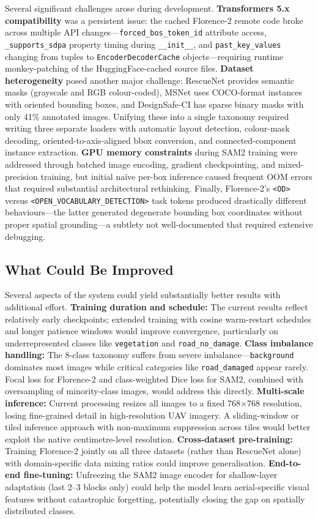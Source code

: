 \documentclass[10pt,a4paper,twocolumn]{article}
\begin{document}
Several significant challenges arose during development. \textbf{Transformers 5.x compatibility} was a persistent issue: the cached Florence-2 remote code broke across multiple API changes---\texttt{forced\_bos\_token\_id} attribute access, \texttt{\_supports\_sdpa} property timing during \texttt{\_\_init\_\_}, and \texttt{past\_key\_values} changing from tuples to \texttt{EncoderDecoderCache} objects---requiring runtime monkey-patching of the HuggingFace-cached source files. \textbf{Dataset heterogeneity} posed another major challenge: RescueNet provides semantic masks (grayscale and RGB colour-coded), MSNet uses COCO-format instances with oriented bounding boxes, and DesignSafe-CI has sparse binary masks with only 41\% annotated images. Unifying these into a single taxonomy required writing three separate loaders with automatic layout detection, colour-mask decoding, oriented-to-axis-aligned bbox conversion, and connected-component instance extraction. \textbf{GPU memory constraints} during SAM2 training were addressed through batched image encoding, gradient checkpointing, and mixed-precision training, but initial na\"ive per-box inference caused frequent OOM errors that required substantial architectural rethinking. Finally, Florence-2's \texttt{<OD>} versus \texttt{<OPEN\_VOCABULARY\_DETECTION>} task tokens produced drastically different behaviours---the latter generated degenerate bounding box coordinates without proper spatial grounding---a subtlety not well-documented that required extensive debugging.

\subsection{What Could Be Improved}

Several aspects of the system could yield substantially better results with additional effort. \textbf{Training duration and schedule:} The current results reflect relatively early checkpoints; extended training with cosine warm-restart schedules and longer patience windows would improve convergence, particularly on underrepresented classes like \texttt{vegetation} and \texttt{road\_no\_damage}. \textbf{Class imbalance handling:} The 8-class taxonomy suffers from severe imbalance---\texttt{background} dominates most images while critical categories like \texttt{road\_damaged} appear rarely. Focal loss for Florence-2 and class-weighted Dice loss for SAM2, combined with oversampling of minority-class images, would address this directly. \textbf{Multi-scale inference:} Current processing resizes all images to a fixed 768$\times$768 resolution, losing fine-grained detail in high-resolution UAV imagery. A sliding-window or tiled inference approach with non-maximum suppression across tiles would better exploit the native centimetre-level resolution. \textbf{Cross-dataset pre-training:} Training Florence-2 jointly on all three datasets (rather than RescueNet alone) with domain-specific data mixing ratios could improve generalisation. \textbf{End-to-end fine-tuning:} Unfreezing the SAM2 image encoder for shallow-layer adaptation (last 2--3 blocks only) could help the model learn aerial-specific visual features without catastrophic forgetting, potentially closing the gap on spatially distributed classes.
\end{document}
